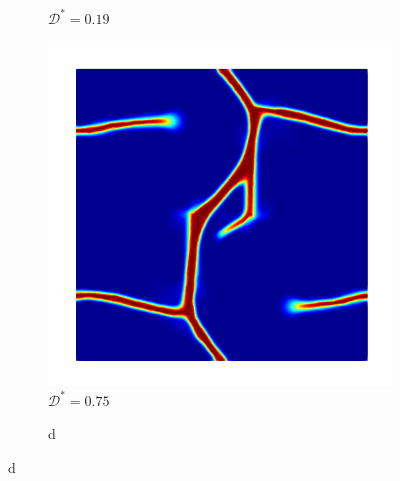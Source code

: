 \begin{figure}[htb!]
\begin{subfigure}[b]{0.23\textwidth}
    \caption{$\mathcal{D}^* = 0.19$}
    \label{fig: Chapter4/biaxial_spectral_2}
  \end{subfigure}
  \hspace{0.03\textwidth}
  \begin{subfigure}[b]{0.23\textwidth}
    \centering
    \includegraphics[width=\textwidth,scale=0.5]{Chapter4/figures/biaxial_spectral_3.png}
    \caption{$\mathcal{D}^* = 0.75$}
    \label{fig: Chapter4/biaxial_spectral_3}
  \end{subfigure}
  \begin{subfigure}[b]{0.065\textwidth}
    \centering
    \caption*{d}

\end{subfigure}
\end{figure}
